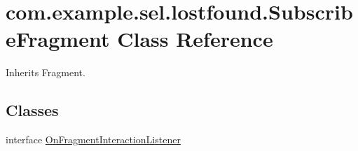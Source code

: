 \hypertarget{classcom_1_1example_1_1sel_1_1lostfound_1_1SubscribeFragment}{\section{com.\-example.\-sel.\-lostfound.\-Subscribe\-Fragment \-Class \-Reference}
\label{classcom_1_1example_1_1sel_1_1lostfound_1_1SubscribeFragment}
}


\-Inherits \-Fragment.

\subsection*{\-Classes}
\begin{DoxyCompactItemize}
\item 
interface \hyperlink{interfacecom_1_1example_1_1sel_1_1lostfound_1_1SubscribeFragment_1_1OnFragmentInteractionListener}{\-On\-Fragment\-Interaction\-Listener}
\end{DoxyCompactItemize}
